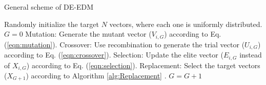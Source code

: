 \begin{algorithm}[t]
  \scriptsize
	\caption{General scheme of DE-EDM} 
	\begin{algorithmic}[1]
	\STATE Randomly initialize the target $N$ vectors, where each one is uniformly distributed.
	\STATE $G=0$
		\STATE Mutation: Generate the mutant vector ($V_{i,G}$) according to Eq. (\ref{eqn:mutation}).
		\STATE Crossover: Use recombination to generate the trial vector ($U_{i,G}$) according to Eq. (\ref{eqn:crossover}).
		\STATE Selection: Update the elite vector ($E_{i,G}$ instead of $X_{i,G}$) according to Eq. (\ref{eqn:selection}).
	   \ENDFOR
		\STATE Replacement: Select the target vectors ($X_{G+1}$) according to Algorithm \ref{alg:Replacement} .
	   \STATE $G=G+1$
	\ENDWHILE
\end{algorithmic}
    \label{alg:DEEDM}
\end{algorithm}

%
%
%
%
%
%
%
%
%

